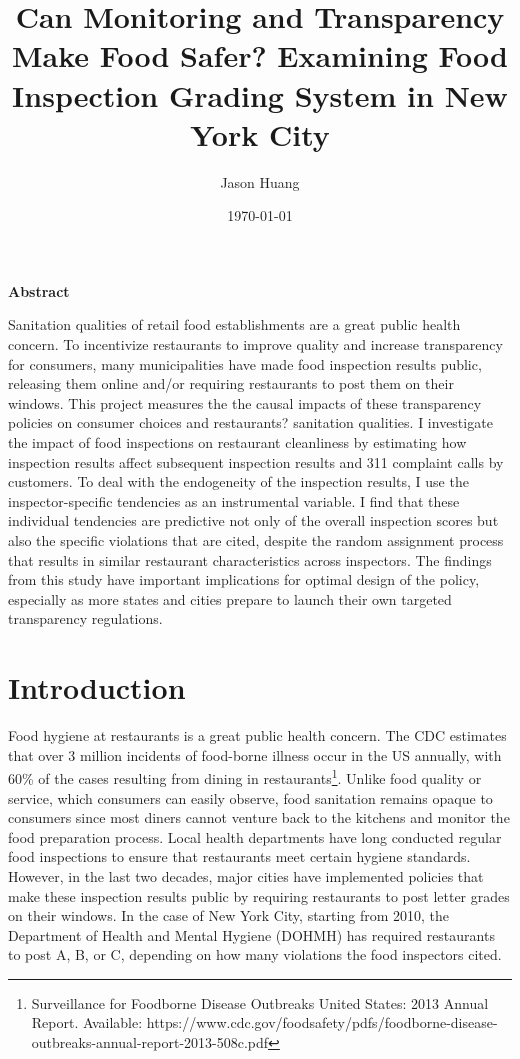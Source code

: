 \documentclass[12pt]{article}
\title{\textbf{Can Monitoring and Transparency Make Food Safer? Examining Food Inspection Grading System in New York City}}
\author{Jason Huang}
\date{\bigskip \today}
\begin{document}
\maketitle

\thispagestyle{empty} \newpage

\onehalfspacing \setcounter{page}{1}


\textbf{Abstract}

Sanitation qualities of retail food establishments are a great public health concern. To incentivize restaurants to improve quality and increase transparency for consumers, many municipalities have made food inspection results public, releasing them online and/or requiring restaurants to post them on their windows. This project measures the the causal impacts of these transparency policies on consumer choices and restaurants? sanitation qualities. I investigate the impact of food inspections on restaurant cleanliness by estimating how inspection results affect subsequent inspection results and 311 complaint calls by customers. To deal with the endogeneity of the inspection results, I use the inspector-specific tendencies as an instrumental variable. I find that these individual tendencies are predictive not only of the overall inspection scores but also the specific violations that are cited, despite the random assignment process that results in similar restaurant characteristics across inspectors. The findings from this study have important implications for optimal design of the policy, especially as more states and cities prepare to launch their own targeted transparency regulations. 

\section*{Introduction}

Food hygiene at restaurants is a great public health concern. The CDC estimates that over 3 million incidents of food-borne illness occur in the US annually, with 60\% of the cases resulting from  dining in restaurants\footnote{Surveillance for Foodborne Disease Outbreaks United States: 2013 Annual Report. Available: https://www.cdc.gov/foodsafety/pdfs/foodborne-disease-outbreaks-annual-report-2013-508c.pdf}. Unlike food quality or service, which consumers can easily observe, food sanitation remains opaque to consumers since most diners cannot venture back to the kitchens and monitor the food preparation process. Local health departments have long conducted regular food inspections to ensure that restaurants meet certain hygiene standards. However, in the last two decades, major cities have implemented policies that make these inspection results public by requiring restaurants to post letter grades on their windows. In the case of New York City, starting from 2010, the Department of Health and Mental Hygiene (DOHMH) has required restaurants to post A, B, or C, depending on how many violations the food inspectors cited.
\end{document}

